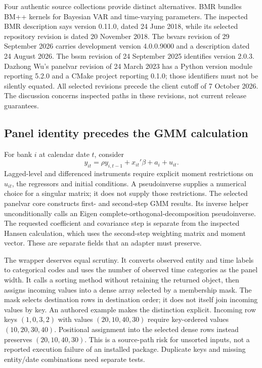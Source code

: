 Four authentic source collections provide distinct alternatives. BMR bundles BM++ kernels for Bayesian VAR and time-varying parameters. The inspected BMR description says version 0.11.0, dated 24 June 2018, while its selected repository revision is dated 20 November 2018. The bsvars revision of 29 September 2026 carries development version 4.0.0.9000 and a description dated 24 August 2026. The bssm revision of 24 September 2025 identifies version 2.0.3. Dazhong Wu's panelvar revision of 24 March 2023 has a Python version module reporting 5.2.0 and a CMake project reporting 0.1.0; those identifiers must not be silently equated. All selected revisions precede the client cutoff of 7 October 2026. The discussion concerns inspected paths in these revisions, not current release guarantees.~\citep{exec25_cdyn_bmr,exec25_cdyn_bsvars,exec25_cdyn_bssm,exec25_cdyn_panelvar}

\subsection{Panel identity precedes the GMM calculation}

For bank $i$ at calendar date $t$, consider
\[
 y_{it}=\rho y_{i,t-1}+x_{it}'\beta+a_i+u_{it}.
\]
Lagged-level and differenced instruments require explicit moment restrictions on $u_{it}$, the regressors and initial conditions. A pseudoinverse supplies a numerical choice for a singular matrix; it does not supply those restrictions. The selected panelvar core constructs first- and second-step GMM results. Its inverse helper unconditionally calls an Eigen complete-orthogonal-decomposition pseudoinverse. The requested coefficient and covariance step is separate from the inspected Hansen calculation, which uses the second-step weighting matrix and moment vector. These are separate fields that an adapter must preserve.~\citep{exec25_cdyn_panelvar}

The wrapper deserves equal scrutiny. It converts observed entity and time labels to categorical codes and uses the number of observed time categories as the panel width. It calls a sorting method without retaining the returned object, then assigns incoming values into a dense array selected by a membership mask. The mask selects destination rows in destination order; it does not itself join incoming values by key. An authored example makes the distinction explicit. Incoming row keys $(1,0,3,2)$ with values $(20,10,40,30)$ require key-ordered values $(10,20,30,40)$. Positional assignment into the selected dense rows instead preserves $(20,10,40,30)$. This is a source-path risk for unsorted inputs, not a reported execution failure of an installed package. Duplicate keys and missing entity/date combinations need separate tests.~\citep{exec25_cdyn_panelvar,exec25_cdyn_choice}

